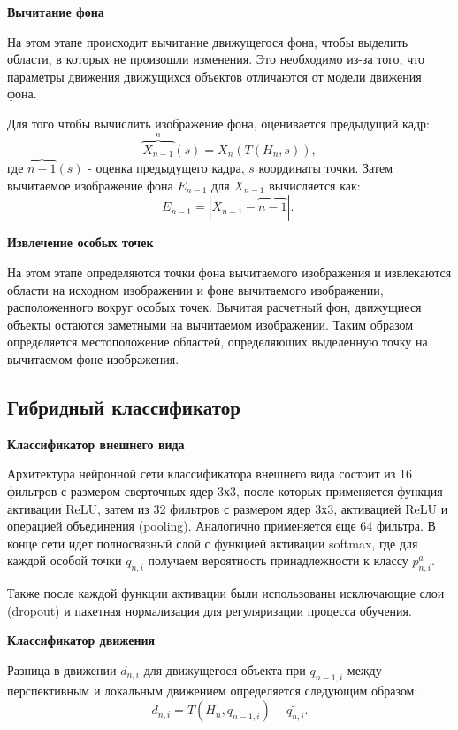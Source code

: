 \textbf{Вычитание фона}

На этом этапе происходит вычитание движущегося фона, чтобы выделить области, в которых не произошли изменения. Это необходимо из-за того, что параметры движения движущихся объектов отличаются от модели движения фона.

Для того чтобы вычислить изображение фона, оценивается предыдущий кадр:
\begin{equation}
\overbrace{X_{n-1}}^n(s)=X_n\left(T\left(H_n, s\right)\right),
\end{equation}
где $\overbrace{n-1}(s)$ - оценка предыдущего кадра, $s$ координаты точки. Затем вычитаемое изображение фона $E_{n-1}$ для $X_{n-1}$ вычисляется как:
\begin{equation}
E_{n-1}=|X_{n-1}-\overbrace{n-1}| \text {. }
\end{equation}

\textbf{Извлечение особых точек}

На этом этапе определяются точки фона вычитаемого изображения и извлекаются области на исходном изображении и фоне вычитаемого изображении, расположенного вокруг особых точек. Вычитая расчетный фон, движущиеся объекты остаются заметными на вычитаемом изображении. Таким образом определяется местоположение областей, определяющих выделенную точку на вычитаемом фоне изображения.

\subsection{Гибридный классификатор}

\textbf{Классификатор внешнего вида}

Архитектура нейронной сети классификатора внешнего вида состоит из 16 фильтров с размером сверточных ядер 3х3, после которых применяется функция активации ReLU, затем из 32 фильтров с размером ядер 3х3, активацией ReLU и операцией объединения (pooling). Аналогично применяется еще 64 фильтра. В конце сети идет полносвязный слой с функцией активации softmax, где для каждой особой точки $q_{n, i}$ получаем вероятность принадлежности к классу $p_{n, i}^a$.

Также после каждой функции активации были использованы исключающие слои (dropout) и пакетная нормализация для регуляризации процесса обучения.

\textbf{Классификатор движения}

Разница в движении $d_{n, i}$ для движущегося объекта при $q_{n-1, i}$ между перспективным и локальным движением определяется следующим образом:
$$
d_{n, i}=T\left(H_n, q_{n-1, i}\right)-\tilde{q_{n, i}} .
$$

